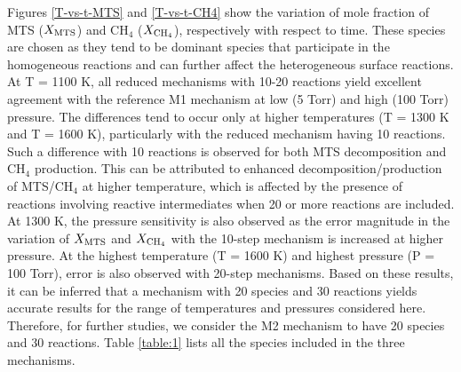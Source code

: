 \documentclass[final, letterpaper, square, comma, numbers, sort&compress]{elsarticle}
\begin{document}
Figures \ref{T-vs-t-MTS} and \ref{T-vs-t-CH4} show the variation of mole fraction of MTS ($X_{\rm MTS}$) and CH$_4$ ($X_{\rm CH_4}$), respectively with respect to time. These species are chosen as they tend to be dominant species that participate in the homogeneous reactions and can further affect the heterogeneous surface reactions. At T = 1100 K, all reduced mechanisms with 10-20 reactions yield excellent agreement with the reference M1 mechanism at low (5 Torr) and high (100 Torr) pressure. The differences tend to occur only at higher temperatures (T = 1300 K and T = 1600 K), particularly with the reduced mechanism having 10 reactions. Such a difference with 10 reactions is observed for both MTS decomposition and CH$_4$ production. This can be attributed to enhanced decomposition/production of MTS/CH$_4$ at higher temperature, which is affected by the presence of reactions involving reactive intermediates when 20 or more reactions are included. At 1300 K, the pressure sensitivity is also observed as the error magnitude in the variation of $X_{\rm MTS}$ and $X_{\rm CH_4}$ with the 10-step mechanism is increased at higher pressure. At the highest temperature (T = 1600 K) and highest pressure (P = 100 Torr), error is also observed with 20-step mechanisms. Based on these results, it can be inferred that a mechanism with 20 species and 30 reactions yields accurate results for the range of temperatures and pressures considered here. Therefore, for further studies, we consider the M2 mechanism to have 20 species and 30 reactions. Table \ref{table:1} lists all the species included in the three mechanisms. 
\end{document}
